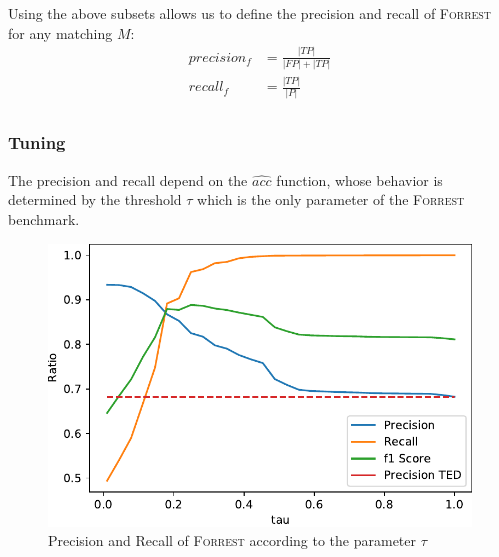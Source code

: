 \documentclass{vldb}
\newcommand{\forrest}[0]{\textsc{Forrest}\xspace}
\begin{document}
Using the above subsets allows us to define the precision and recall of \forrest for any matching $M$:
\begin{equation}
    \begin{split}
        precision_f & = \frac{|TP|}{|FP| + |TP|}\\ 
        recall_f    & = \frac{|TP|}{|P|}\\ 
    \end{split}
\end{equation}

\subsubsection{Tuning}


The precision and recall depend on the $\hat{acc}$ function, whose behavior is determined by the threshold $\tau$ which is the only parameter of the \forrest benchmark.

\begin{figure}
    \centering
    \includegraphics[width=1\linewidth]{graphs/precisionrecall_tau.pdf}
    \caption{Precision and Recall of \forrest according to the parameter $\tau$}
    \label{fig:tuning_tau}
\end{figure}
\end{document}
